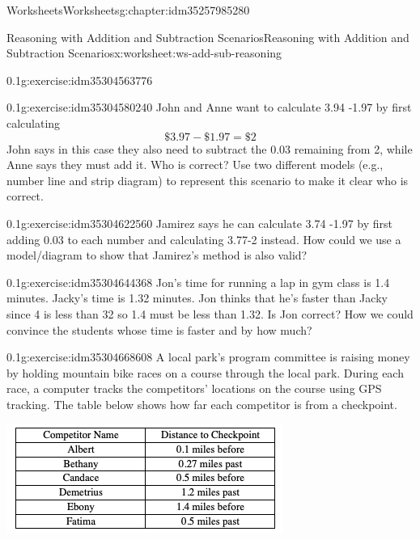\documentclass[twoside,11pt,]{book}
\begin{document}
\begin{chapterptx}{Worksheets}{}{Worksheets}{}{}{g:chapter:idm35257985280}
\begin{worksheet-section-numberless}{Reasoning with Addition and Subtraction Scenarios}{}{Reasoning with Addition and Subtraction Scenarios}{}{}{x:worksheet:ws-add-sub-reasoning}
\begin{divisionexercise}{1}{}{0.1}{g:exercise:idm35304563776}
\end{divisionexercise}%
\begin{divisionexercise}{2}{}{0.1}{g:exercise:idm35304580240}%
John and Anne want to calculate \textdollar{}3.94 -\textdollar{}1.97 by first calculating%
\begin{equation*}
\$3.97-\$1.97 = \$2 
\end{equation*}
John says in this case they also need to subtract the \textdollar{}0.03 remaining from \textdollar{}2, while Anne says they must add it.  Who is correct?  Use two different models (e.g., number line and strip diagram) to represent this scenario to make it clear who is correct.%
\end{divisionexercise}%
\begin{divisionexercise}{3}{}{0.1}{g:exercise:idm35304622560}%
Jamirez says he can calculate \textdollar{}3.74 -\textdollar{}1.97 by first adding \textdollar{}0.03 to each number and calculating \textdollar{}3.77-\textdollar{}2 instead.  How could we use a model\slash{}diagram to show that Jamirez’s method is also valid?%
\end{divisionexercise}%
\begin{divisionexercise}{4}{}{0.1}{g:exercise:idm35304644368}%
Jon’s time for running a lap in gym class is 1.4 minutes.  Jacky’s time is 1.32 minutes.  Jon thinks that he’s faster than Jacky since 4 is less than 32 so 1.4 must be less than 1.32.  Is Jon correct?  How we could convince the students whose time is faster and by how much?%
\end{divisionexercise}%
\begin{divisionexercise}{5}{}{0.1}{g:exercise:idm35304668608}%
A local park’s program committee is raising money by holding mountain bike races on a course through the local park.  During each race, a computer tracks the competitors’ locations on the course using GPS tracking.  The table below shows how far each competitor is from a checkpoint.%
\begin{sidebyside}{1}{0.05}{0.05}{0}%
\begin{sbspanel}{0.9}%
\includegraphics[width=1\linewidth]{images/reasoning-table-checkpoint.png}

\end{sbspanel}
\end{sidebyside}
\end{divisionexercise}
\end{worksheet-section-numberless}
\end{chapterptx}
\end{document}
